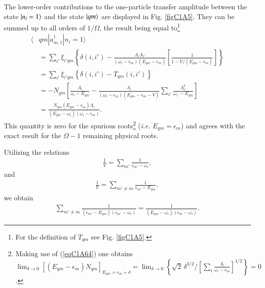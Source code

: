The lower-order contributions to the one-particle transfer amplitude between the state $|{n_i=1} \rangle$ and the state $|{qm} \rangle$ are displayed in Fig. \ref{figC1A5}. They can be summed up to all orders of $1/\Omega$, the result being equal to\footnote{For the definition of $T_{qm}$ see Fig. \ref{figC1A5}.} 
  \begin{align}\label{eqC1A73} 
   \nonumber \langle & qm|a^\dagger_{m,1}|n_i=1\rangle\\
\nonumber &=\sum_{i'}\xi_{i'qm}\left\{\delta(i,i')-\frac{\Lambda_i\Lambda_{i'}}{(\omega_i-\epsilon_m)(E_{qm}-\epsilon_m)}\left[\frac{1}{1-V/(E_{qm}-\epsilon_m)}\right]\right\}\\
\nonumber &=\sum_{i'}\xi_{i'qm}\left\{\delta(i,i')-T_{qm}(i,i')\right\}\\
\nonumber & =-N_{qm}\left[\frac{\Lambda_i}{\omega_i-E_{qm}}-\frac{\Lambda_i}{(\omega_i-\epsilon_m)(E_{qm}-\epsilon_m-V)}\sum_{i'}\frac{\Lambda_{i'}^2}{\omega_{i'}-E_{qm}}\right]\\
&=\frac{N_{qm}(E_{qm}-\epsilon_m)\Lambda_i}{(E_{qm}-\omega_i)(\omega_i-\epsilon_m)}.
\end{align} 
This quantity is zero for the spurious roots\footnote{Making use of (\ref{eqC1A64}) one obtains  $\lim_{\delta\to0}[(E_{qm}-\epsilon_m)N_{qm}]_{E_{qm}=\epsilon_m+\delta}=\lim_{\delta\to0}\left\{\sqrt{2}\,\delta^{3/2}/[\sum_i\frac{\Lambda_i}{\omega_i-\epsilon_m}]^{1/2}\right\}=0$.} (\textit{i.e.} $E_{qm}=\epsilon_m$) and agrees with the exact result for the $\Omega-1$ remaining physical roots. 


Utilizing the relations
  \begin{align}\label{eqC1A74} 
  \frac{1}{V}=\sum_{m'}\frac{1}{\epsilon_{m'}-\omega_i},
    \end{align}  
and  
  \begin{align}\label{eqC1A75} 
   \frac{1}{V}=\sum_{m'\neq m}\frac{1}{\epsilon_{m'}-E_{qm}},
    \end{align} 
we  obtain  
  \begin{align}\label{eqC1A76} 
   \sum_{m'\neq m}\frac{1}{(\epsilon_{m'}-E_{qm})(\epsilon_{m'}-\omega_i)}=\frac{1}{(E_{qm}-\omega_i)(\epsilon_m-\omega_i)}.
    \end{align} 

